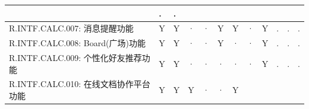 \begin{table}[htbp]
\begin{tabular}{|p{9em}|p{2em}|p{2em}|p{2em}|p{2em}|p{2em}|
                            p{2em}|p{2em}|p{2em}|p{2em}|p{2em}|p{2em}|}
                & .                     & . \\
            \hline %
            R.INTF.CALC.007: 消息提醒功能
                & Y                     & Y                 & · 
                & ·                     & Y                 & Y 
                & ·                     & Y                 & .
                & .                     & . \\
            \hline %
            R.INTF.CALC.008: Board(广场)功能
                & Y                     & Y                 & · 
                & ·                     & Y                 & · 
                & ·                     & Y                 & .
                & .                     & . \\
            \hline %
            R.INTF.CALC.009: 个性化好友推荐功能
                & Y                     & Y                 & · 
                & ·                     & ·                 & · 
                & ·                     & Y                 & .
                & .                     & . \\
            \hline %
            R.INTF.CALC.010: 在线文档协作平台功能
                & Y                     & Y                 & Y 
                & ·                     & ·                 & Y 

\end{tabular}
\end{table}
